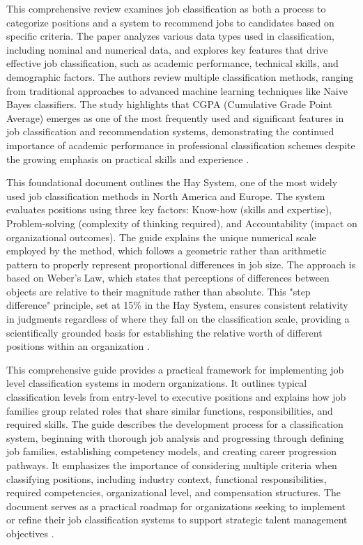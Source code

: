 \documentclass[../main.tex]{subfiles}
\begin{document}
This comprehensive review examines job classification as both a process to categorize positions and a system to recommend jobs to candidates based on specific criteria. The paper analyzes various data types used in classification, including nominal and numerical data, and explores key features that drive effective job classification, such as academic performance, technical skills, and demographic factors. The authors review multiple classification methods, ranging from traditional approaches to advanced machine learning techniques like Naive Bayes classifiers. The study highlights that CGPA (Cumulative Grade Point Average) emerges as one of the most frequently used and significant features in job classification and recommendation systems, demonstrating the continued importance of academic performance in professional classification schemes despite the growing emphasis on practical skills and experience \cite{jeesr2021}.

This foundational document outlines the Hay System, one of the most widely used job classification methods in North America and Europe. The system evaluates positions using three key factors: Know-how (skills and expertise), Problem-solving (complexity of thinking required), and Accountability (impact on organizational outcomes). The guide explains the unique numerical scale employed by the method, which follows a geometric rather than arithmetic pattern to properly represent proportional differences in job size. The approach is based on Weber's Law, which states that perceptions of differences between objects are relative to their magnitude rather than absolute. This "step difference" principle, set at 15\% in the Hay System, ensures consistent relativity in judgments regardless of where they fall on the classification scale, providing a scientifically grounded basis for establishing the relative worth of different positions within an organization \cite{haygroup2024}.

This comprehensive guide provides a practical framework for implementing job level classification systems in modern organizations. It outlines typical classification levels from entry-level to executive positions and explains how job families group related roles that share similar functions, responsibilities, and required skills. The guide describes the development process for a classification system, beginning with thorough job analysis and progressing through defining job families, establishing competency models, and creating career progression pathways. It emphasizes the importance of considering multiple criteria when classifying positions, including industry context, functional responsibilities, required competencies, organizational level, and compensation structures. The document serves as a practical roadmap for organizations seeking to implement or refine their job classification systems to support strategic talent management objectives \cite{deel2024}.
\end{document}

